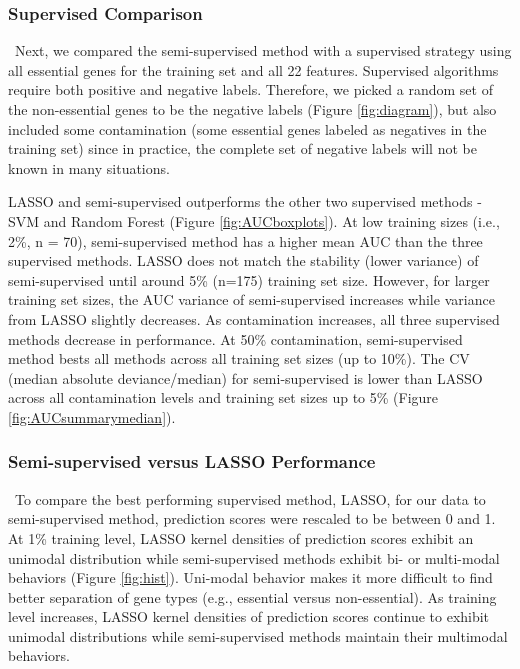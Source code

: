 \documentclass{bmcart}
\begin{document}
\subsubsection*{Supervised Comparison}\label{subsubsection:supervised.compare}\
Next, we compared the semi-supervised method with a supervised strategy using all essential genes for the training set and all 22 features. Supervised algorithms require both positive and negative labels. Therefore, we picked a random set of the non-essential genes to be the negative labels (Figure \ref{fig:diagram}), but also included some contamination (some essential genes labeled as negatives in the training set) since in practice, the complete set of negative labels will not be known in many situations.  

LASSO and semi-supervised outperforms the other two supervised methods - SVM and Random Forest (Figure \ref{fig:AUCboxplots}). At low training sizes (i.e., 2\%, n = 70), semi-supervised method has a higher mean AUC than the three supervised methods. LASSO does not match the stability (lower variance) of semi-supervised until around 5\% (n=175) training set size. However, for larger training set sizes, the AUC variance of semi-supervised increases while variance from LASSO slightly decreases. As contamination increases, all three supervised methods decrease in performance. At 50\% contamination, semi-supervised method bests all methods across all training set sizes (up to 10\%). The CV (median absolute deviance/median) for semi-supervised is lower than LASSO across all contamination levels and training set sizes up to 5\% (Figure \ref{fig:AUCsummarymedian}).

\subsubsection*{Semi-supervised versus LASSO Performance}\label{subsubsection:performance.compare}\
To compare the best performing supervised method, LASSO, for our data to semi-supervised method, prediction scores were rescaled to be between 0 and 1. At 1\% training level, LASSO kernel densities of prediction scores exhibit an unimodal distribution while semi-supervised methods exhibit  bi- or multi-modal behaviors (Figure \ref{fig:hist}). Uni-modal behavior makes it more difficult to find better separation of gene types (e.g., essential versus non-essential). As training level increases, LASSO kernel densities of prediction scores continue to exhibit unimodal distributions while semi-supervised methods maintain their multimodal behaviors.  
\end{document}
